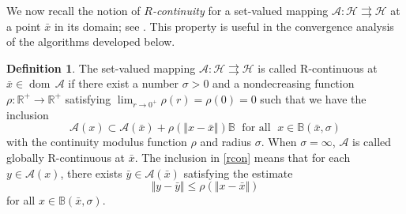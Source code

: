 \documentclass[11pt]{article}
\theoremstyle{definition}
\newtheorem{definition}[theorem]{Definition}
\theoremstyle{definition}
\theoremstyle{definition}
\newcommand{\ball}{\ensuremath{\mathbb B}}
\newcommand{\dom}{\ensuremath{\operatorname{dom}}}
\begin{document}
We   now  recall the notion of \emph{$R$-continuity} for a set-valued mapping
$\mathcal{A}:\mathcal{H}\rightrightarrows\mathcal{H}$ at a point
$\bar{x}$ in its domain; see \cite{Le,LMT,LT}. This property is useful in
the convergence analysis of the algorithms developed below.

\begin{definition}\label{rdef}
The set-valued mapping \noindent $\mathcal{A}:\mathcal{H} \rightrightarrows \mathcal{H}$ is called {\sc R-continuous} at ${\bar x}\in\dom\,\mathcal{A}$ if there exist a number $\sigma>0$ and a nondecreasing function $\rho: \mathbb{R}^+\to \mathbb{R}^+$ satisfying $\lim_{r\to 0^+}\rho(r)=\rho(0)=0$ such that we have the inclusion
\begin{equation}\label{rcon}
\mathcal{A}(x) \subset \mathcal{A}({\bar x}  )+\rho(\Vert x-{\bar x}   \Vert)\ball\;\mbox{ for all }\;x\in  \ball({\bar x} ,\sigma)
\end{equation}
with the {\sc continuity modulus function} $\rho$ and {\sc radius} $\sigma$. When $\sigma=\infty$, $\mathcal{A}$ is  called {\sc globally R-continuous} at ${\bar x}$. The inclusion in \eqref{rcon} means that for each $y\in \mathcal{A}(x)$, there exists ${\bar y}  \in  \mathcal{A}({\bar x} )$ satisfying the estimate 
$$
\Vert y-{\bar y}  \Vert\le \rho(\Vert x-{\bar x}   \Vert)
$$ 
for all $x\in \ball({\bar x},\sigma)$.
\end{definition}

%
\end{document}
